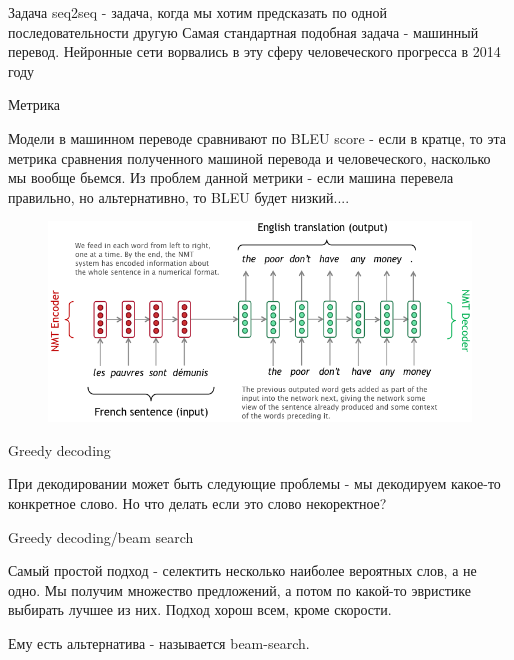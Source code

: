 \documentclass[notes,12pt, aspectratio=169]{beamer}
\begin{document}
\begin{frame}
\centering Задача seq2seq  - задача, когда мы хотим предсказать по одной последовательности другую
Самая стандартная подобная задача - машинный перевод. Нейронные сети ворвались в эту сферу человеческого прогресса в 2014 году
\end{frame}

\begin{frame}{Метрика}

Модели в машинном переводе сравнивают по BLEU score - если в кратце, то эта метрика сравнения полученного машиной перевода и человеческого, насколько мы вообще бьемся. Из проблем данной метрики - если машина перевела правильно, но альтернативно, то BLEU будет низкий....
\end{frame}

\begin{frame}
	\begin{figure}
		\centering
		\includegraphics[width=1\linewidth]{images/seq2seq}
		\label{fig:seq2seq}
	\end{figure}
\end{frame}

\begin{frame}{Greedy decoding}

При декодировании может быть следующие проблемы - мы декодируем какое-то конкретное слово.
Но что делать если это слово некоректное?
\end{frame}

\begin{frame}{Greedy decoding/beam search}

Самый простой подход - селектить несколько наиболее вероятных слов, а не одно. Мы получим множество предложений, а потом по какой-то эвристике выбирать лучшее из них. Подход хорош всем, кроме скорости.

Ему есть альтернатива - называется beam-search.
\end{frame}
\end{document}
